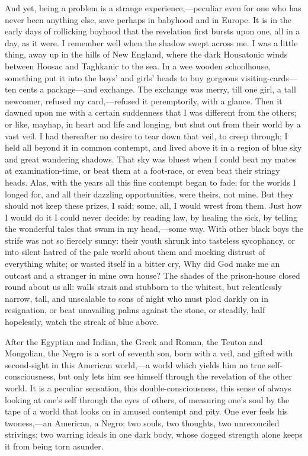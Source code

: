 And yet, being a problem is a strange experience,---pe\-cu\-liar even
for one who has never been anything else, save perhaps in babyhood and
in Europe. It is in the early days of rollicking boyhood that the
revelation first bursts upon one, all in a day, as it were. I
remember well when the shadow swept across me. I was a little thing,
away up in the hills of New England, where the dark Housatonic winds
between Hoosac and Taghkanic to the sea. In a wee wooden schoolhouse,
something put it into the boys' and girls' heads to buy gorgeous
visiting-cards---ten cents a package---and exchange. The exchange was
merry, till one girl, a tall newcomer, refused my card,---re\-fused it
peremptorily, with a glance. Then it dawned upon me with a certain
suddenness that I was different from the others; or like, mayhap, in
heart and life and longing, but shut out from their world by a vast
veil. I had thereafter no desire to tear down that veil, to creep
through; I held all beyond it in common contempt, and lived above it
in a region of blue sky and great wandering shadows. That sky was
bluest when I could beat my mates at examination-time, or beat them at
a foot-race, or even beat their stringy heads. Alas, with the years
all this fine contempt began to fade; for the worlds I longed for, and
all their dazzling opportunities, were  theirs, not mine. But
they should not keep these prizes, I said; some, all, I would wrest
from them. Just how I would do it I could never decide: by reading
law, by healing the sick, by telling the wonderful tales that swam
in my head,---some way. With other black boys the strife was not so
fiercely sunny: their youth shrunk into tasteless sycophancy, or into
silent hatred of the pale world about them and mocking distrust of
everything white; or wasted itself in a bitter cry, Why did God make
me an outcast and a stranger in mine own house? The shades of the
prison-house closed round about us all: walls strait and stubborn to
the whitest, but relentlessly narrow, tall, and unscalable to sons
of night who must plod darkly on in resignation, or beat unavailing
palms against the stone, or steadily, half hopelessly, watch the
streak of blue above.

After the Egyptian and Indian, the Greek and Roman, the Teuton and
Mongolian, the Negro is a sort of seventh son, born with a veil, and
gifted with second-sight in this American world,---a world which
yields him no true self-consciousness, but only lets him see himself
through the revelation of the other world. It is a peculiar sensation,
this double-consciousness, this sense of always looking at one's self
through the eyes of others, of measuring one's soul by the tape of a
world that looks on in amused contempt and pity. One ever feels his
twoness,---an American, a Negro; two souls, two thoughts, two
unreconciled strivings; two warring ideals in one dark body, whose
dogged strength alone keeps it from being torn asunder.


